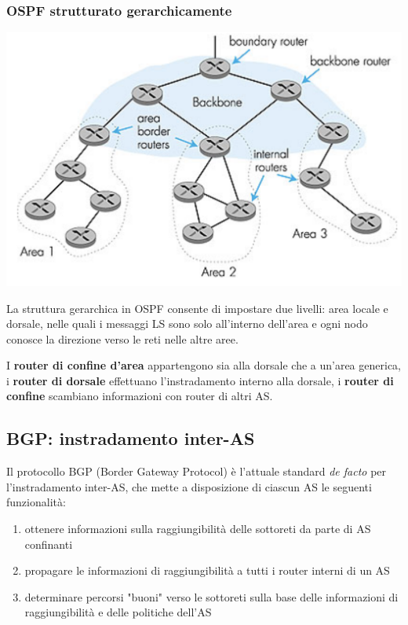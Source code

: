 \documentclass{report}
\begin{document}
\hypertarget{header-n263}{%
\subsubsection{OSPF strutturato gerarchicamente}\label{header-n263}}

\begin{center}
		\includegraphics[width=0.7\linewidth]{ospf-gerarchia}
	\end{center}

La struttura gerarchica in OSPF consente di impostare due livelli: area
locale e dorsale, nelle quali i messaggi LS sono solo all'interno
dell'area e ogni nodo conosce la direzione verso le reti nelle altre
aree.

I \textbf{router di confine d'area} appartengono sia alla dorsale che a
un'area generica, i \textbf{router di dorsale} effettuano
l'instradamento interno alla dorsale, i \textbf{router di confine}
scambiano informazioni con router di altri AS.

\hypertarget{header-n267}{%
\subsection{BGP: instradamento inter-AS}\label{header-n267}}

Il protocollo BGP (Border Gateway Protocol) è l'attuale standard
\emph{de facto} per l'instradamento inter-AS, che mette a disposizione
di ciascun AS le seguenti funzionalità:

\begin{enumerate}
\def\labelenumi{\arabic{enumi}.}
\item
  ottenere informazioni sulla raggiungibilità delle sottoreti da parte
  di AS confinanti
\item
  propagare le informazioni di raggiungibilità a tutti i router interni
  di un AS
\item
  determinare percorsi "buoni" verso le sottoreti sulla base delle
  informazioni di raggiungibilità e delle politiche dell'AS
\end{enumerate}
\end{document}
